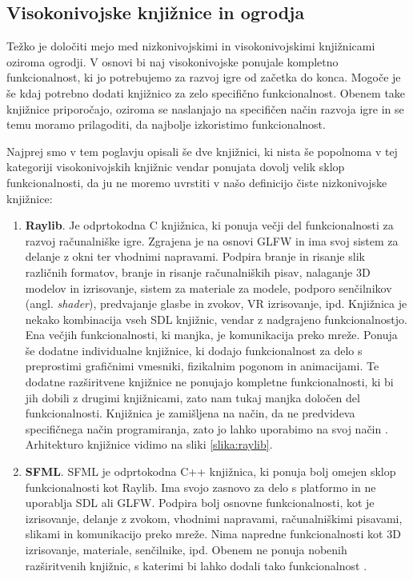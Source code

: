 \documentclass[12pt,a4paper,twoside]{book}
\begin{document}
\subsection{Visokonivojske knjižnice in ogrodja}
Težko je določiti mejo med nizkonivojskimi in visokonivojskimi knjižnicami oziroma ogrodji. V osnovi bi naj visokonivojske ponujale kompletno funkcionalnost, ki jo potrebujemo za razvoj igre od začetka do konca. Mogoče je še kdaj potrebno dodati knjižnico za zelo specifično funkcionalnost. Obenem take knjižnice priporočajo, oziroma se naslanjajo na specifičen način razvoja igre in se temu moramo prilagoditi, da najbolje izkoristimo funkcionalnost. 

Najprej smo v tem poglavju opisali še dve knjižnici, ki nista še popolnoma v tej kategoriji visokonivojskih knjižnic vendar ponujata dovolj velik sklop funkcionalnosti, da ju ne moremo uvrstiti v našo definicijo čiste nizkonivojske knjižnice:
\begin{enumerate}
	\item \textbf{Raylib}. Je odprtokodna C knjižnica, ki ponuja večji del funkcionalnosti za razvoj računalniške igre. Zgrajena je na osnovi GLFW in ima svoj sistem za delanje z okni ter vhodnimi napravami. Podpira branje in risanje slik različnih formatov, branje in risanje računalniških pisav, nalaganje 3D modelov in izrisovanje, sistem za materiale za modele, podporo senčilnikov (angl. \textit{shader}), predvajanje glasbe in zvokov, VR izrisovanje, ipd. Knjižnica je nekako kombinacija vseh SDL knjižnic, vendar z nadgrajeno funkcionalnostjo. Ena večjih funkcionalnosti, ki manjka, je komunikacija preko mreže. Ponuja še dodatne individualne knjižnice, ki dodajo funkcionalnost za delo s preprostimi grafičnimi vmesniki, fizikalnim pogonom in animacijami. Te dodatne razširitvene knjižnice ne ponujajo kompletne funkcionalnosti, ki bi jih dobili z drugimi knjižnicami, zato nam tukaj manjka določen del funkcionalnosti. Knjižnica je zamišljena na način, da ne predvideva specifičnega način programiranja, zato jo lahko uporabimo na svoj način \cite{raylib}. Arhitekturo knjižnice vidimo na sliki \ref{slika:raylib}.
	\item \textbf{SFML}. SFML je odprtokodna C++ knjižnica, ki ponuja bolj omejen sklop funkcionalnosti kot Raylib. Ima svojo zasnovo za delo s platformo in ne uporablja SDL ali GLFW. Podpira bolj osnovne funkcionalnosti, kot je izrisovanje, delanje z zvokom, vhodnimi napravami, računalniškimi pisavami, slikami in komunikacijo preko mreže. Nima napredne funkcionalnosti kot 3D izrisovanje, materiale, senčilnike, ipd. Obenem ne ponuja nobenih razširitvenih knjižnic, s katerimi bi lahko dodali tako funkcionalnost \cite{sfml}. 
\end{enumerate}
\end{document}

